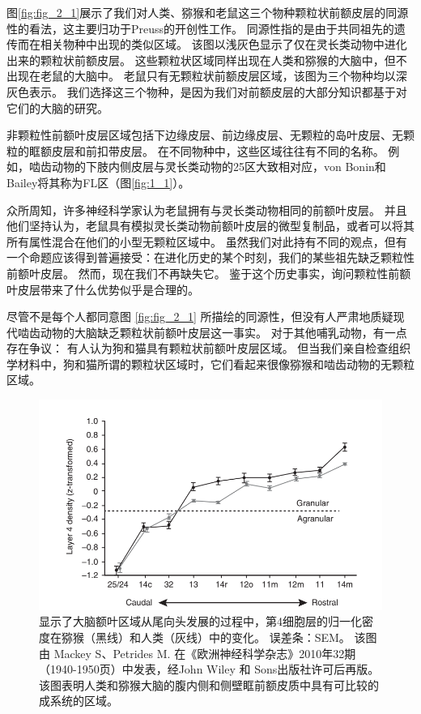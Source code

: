 图\ref{fig:fig_2_1}展示了我们对人类、猕猴和老鼠这三个物种颗粒状前额皮层的同源性的看法，这主要归功于Preuss\cite{Preuss1991a}的开创性工作。
同源性指的是由于共同祖先的遗传而在相关物种中出现的类似区域。
该图以浅灰色显示了仅在灵长类动物中进化出来的颗粒状前额皮层。
这些颗粒状区域同样出现在人类和猕猴的大脑中，但不出现在老鼠的大脑中。
老鼠只有无颗粒状前额皮层区域，该图为三个物种均以深灰色表示。
我们选择这三个物种，是因为我们对前额皮层的大部分知识都基于对它们的大脑的研究。


非颗粒性前额叶皮层区域包括下边缘皮层、前边缘皮层、无颗粒的岛叶皮层、无颗粒的眶额皮层和前扣带皮层。
在不同物种中，这些区域往往有不同的名称。
例如，啮齿动物的下肢内侧皮层与灵长类动物的25区大致相对应，von Bonin和Bailey将其称为FL区（图\ref{fig:1_1}）。


众所周知，许多神经科学家认为老鼠拥有与灵长类动物相同的前额叶皮层。
并且他们坚持认为，老鼠具有模拟灵长类动物前额叶皮层的微型复制品，或者可以将其所有属性混合在他们的小型无颗粒区域中\cite{kolb2007all,seamans2008comparing,schoenbaum2009new}。
虽然我们对此持有不同的观点，但有一个命题应该得到普遍接受：在进化历史的某个时刻，我们的某些祖先缺乏颗粒性前额叶皮层。
然而，现在我们不再缺失它。
鉴于这个历史事实，询问颗粒性前额叶皮层带来了什么优势似乎是合理的。


尽管不是每个人都同意图 \ref{fig:fig_2_1} 所描绘的同源性，但没有人严肃地质疑现代啮齿动物的大脑缺乏颗粒状前额叶皮层这一事实。
对于其他哺乳动物，有一点存在争议：
有人认为狗\cite{rajkowska1988intrinsic}和猫\cite{je1948orbitofrontal}具有颗粒状前额叶皮层区域。
但当我们亲自检查组织学材料中，狗和猫所谓的颗粒状区域时，它们看起来很像猕猴和啮齿动物的无颗粒区域。


\begin{figure}[!htb]
	\centering
	\includegraphics[width=0.8\linewidth]{image_pfc/Fig_2_2}
	\caption{显示了大脑额叶区域从尾向头发展的过程中，第4细胞层的归一化密度在猕猴（黑线）和人类（灰线）中的变化。
		误差条：SEM。
		该图由 Mackey S、Petrides M. 在《欧洲神经科学杂志》2010年32期（1940-1950页）中发表，经John Wiley 和 Sons出版社许可后再版。
		该图表明人类和猕猴大脑的腹内侧和侧壁眶前额皮质中具有可比较的成系统的区域。\label{fig:fig_2_2}}
\end{figure}


